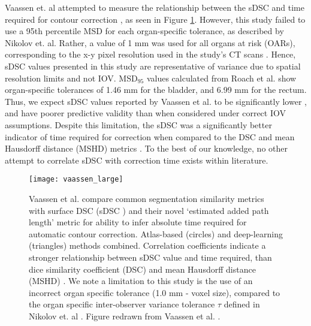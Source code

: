 Vaassen et. al attempted to measure the relationship between the sDSC and time required for contour correction \cite{vaassen2020}, as seen in Figure \ref{fig:vaassen}. However, this study failed to use a 95th percentile MSD for each organ-specific tolerance, as described by Nikolov et. al. Rather, a value of 1 mm was used for all organs at risk (OARs), corresponding to the x-y pixel resolution used in the study's CT scans \cite{vaassen2020}. Hence, sDSC values presented in this study are representative of variance due to spatial resolution limits and not IOV. MSD$_{95}$ values calculated from Roach et al. show organ-specific tolerances of 1.46 mm for the bladder, and 6.99 mm for the rectum. Thus, we expect sDSC values reported by Vaassen et al. to be significantly lower \cite{Nikolov_2018}, and have poorer predictive validity than when considered under correct IOV assumptions. Despite this limitation, the sDSC was a significantly better indicator of time required for correction when compared to the DSC and mean Hausdorff distance (MSHD) metrics \cite{vaassen2020}. To the best of our knowledge, no other attempt to correlate sDSC with correction time exists within literature.

\begin{figure}[H]
	\begin{center}
		\texttt{[image: vaassen\_large]}
		\caption{Vaassen et al. compare common segmentation similarity metrics with surface DSC (sDSC \cite{Nikolov_2018}) and their novel `estimated added path length' metric for ability to infer absolute time required for automatic contour correction. Atlas-based (circles) and deep-learning (triangles) methods combined. Correlation coefficients indicate a stronger relationship between sDSC value and time required, than dice similarity coefficient (DSC) and mean Hausdorff distance (MSHD) \cite{Vaassen_2020}. We note a limitation to this study is the use of an incorrect organ specific tolerance (1.0 mm - voxel size), compared to the organ specific inter-observer variance tolerance $\tau$ defined in Nikolov et. al \cite{Nikolov_2018}. Figure redrawn from Vaassen et al.  \cite{Vaassen_2020}.}
		\label{fig:vaassen}
	\end{center}
\end{figure}




